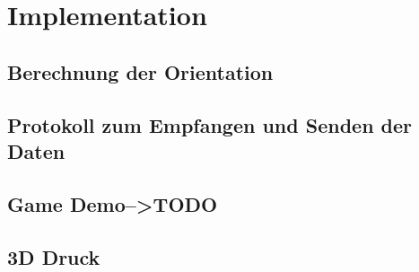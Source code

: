 \section{Implementation}

\subsection{Berechnung der Orientation}

\newpage

\subsection{Protokoll zum Empfangen und Senden der Daten}

\newpage

\subsection{Game Demo-->TODO} 

\newpage

\subsection{3D Druck} 

\newpage
